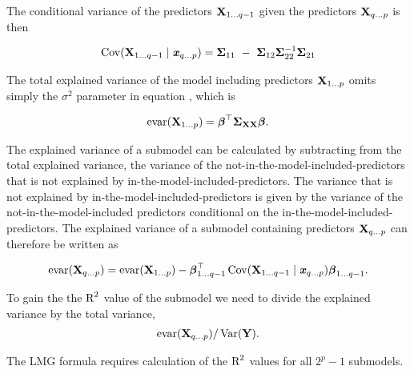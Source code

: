\documentclass[11pt,a4paper,twoside]{book}
\begin{document}
 The conditional variance of the predictors $ {\mathbf{X}}_{1 \dots q-1} $ given the predictors  $ {\mathbf{X}}_{q \dots p} $ is then
 
          \begin{align} 
 \cov(\X_{1\dots q-1} \mid \x_{q \dots p}) = \bSigma_{11}\ -\ \bSigma_{12} \bSigma_{22}^{-1}\bSigma_{21}
       \end{align}
       
       The total explained variance of the model including predictors ${\mathbf{X}}_{1 \dots p}$ omits simply the $\sigma^2$ parameter in equation , which is

      \begin{align} 
        \text{evar}({\mathbf{X}}_{1 \dots p}) = {\boldsymbol{\beta}}^\top {\boldsymbol{\Sigma}}{}_{{\mathbf{X}} {\mathbf{X}}}  {\boldsymbol{\beta}}. 
   \end{align}

The explained variance of a submodel can be calculated by subtracting from the total explained variance, the variance of the not-in-the-model-included-predictors that is not explained by in-the-model-included-predictors. The variance that is not explained by in-the-model-included-predictors is given by the variance of the not-in-the-model-included predictors conditional on the in-the-model-included-predictors. The explained variance of a submodel containing predictors ${\mathbf{X}}_{q \dots p}$ can therefore be written as

       \begin{align} 
       \text{evar}({\mathbf{X}}_{q \dots p}) =  \text{evar}({\mathbf{X}}_{1  \dots p}) - {\boldsymbol{\beta}}^\top_{1 \dots q-1} \operatorname{Cov}({\mathbf{X}}_{1\dots {q-1}} \mid {\textbf{\textit{x}}}_{q \dots p}) {\boldsymbol{\beta}}_{1 \dots {q-1}}.
   \end{align}

To gain the the $\text{R}^2$ value of the submodel we need to divide the explained variance by the total variance,
       \begin{align} 
\text{evar}({\mathbf{X}}_{q \dots p}) / \operatorname{Var}({\mathbf{Y}}).   
\end{align}

The LMG formula requires calculation of the $\text{R}^2$ values for all $2^p-1$ submodels. 
\end{document}
